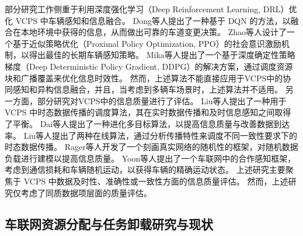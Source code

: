 部分研究工作侧重于利用深度强化学习（Deep Reinforcement Learning, DRL）优化 VCPS 中车辆感知和信息融合。
Dong等人\cite{dong2020spatio}提出了一种基于 DQN 的方法，以融合在本地环境中获得的信息，从而做出可靠的车道变更决策。
Zhao等人\cite{zhao2020social}设计了一个基于近似策略优化（Proximal Policy Optimization, PPO）的社会意识激励机制，以得出最佳的长期车辆感知策略。
Mika等人\cite{mlika2022deep}提出了一个基于深度确定性策略梯度（Deep Deterministic Policy Gradient, DDPG）的解决方案，通过调度资源块和广播覆盖来优化信息时效性。
然而，上述算法不能直接应用于VCPS中的协同感知和异构信息融合，并且，当考虑到多辆车场景时，上述算法并不适用。
另一方面，部分研究对VCPS中的信息质量进行了评估。
Liu等人\cite{liu2014temporal}提出了一种用于 VCPS 中时态数据传播的调度算法，其在实时数据传播和及时信息感知之间取得了平衡。
Dai等人\cite{dai2019temporal}提出了一种进化多目标算法，以提高信息质量与改善数据到达率。
Liu等人\cite{liu2014scheduling}提出了两种在线算法，通过分析传播特性来调度不同一致性要求下的时态数据传播。
Rager等人\cite{rager2017scalability}开发了一个刻画真实网络的随机性的框架，对随机数据负载进行建模以提高信息质量。
Yoon等人\cite{yoon2021performance}提出了一个车联网中的合作感知框架，考虑到通信损耗和车辆随机运动，以获得车辆的精确运动状态。
上述研究主要聚焦于 VCPS 中数据及时性、准确性或一致性方面的信息质量评估。
然而，上述研究仅考虑了同质数据项层面的质量评估。

\subsection{车联网资源分配与任务卸载研究与现状}

